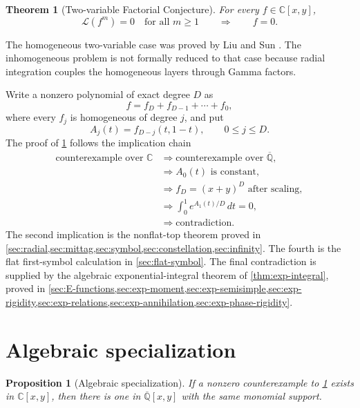 \documentclass[11pt]{article}
\numberwithin{equation}{section}
\newtheorem{theorem}{Theorem}[section]
\newtheorem{proposition}[proposition]{Proposition}
\theoremstyle{definition}
\theoremstyle{remark}
\newcommand{\C}{\mathbb C}
\newcommand{\Qbar}{\overline{\mathbb Q}}
\newcommand{\Lfac}{\mathcal L}
\begin{document}
\begin{theorem}[Two-variable Factorial Conjecture]\label{thm:FC2}
For every $f\in\C[x,y]$,
\[
  \Lfac(f^m)=0\quad\text{for all }m\ge1
  \qquad\Longrightarrow\qquad f=0.
\]
\end{theorem}

The homogeneous two-variable case was proved by Liu and Sun
\cite{LiuSun}.  The inhomogeneous problem is not formally reduced to that
case because radial integration couples the homogeneous layers through
Gamma factors.

Write a nonzero polynomial of exact degree $D$ as
\[
  f=f_D+f_{D-1}+\cdots+f_0,
\]
where every $f_j$ is homogeneous of degree $j$, and put
\begin{equation}\label{eq:intro-projective-layers}
  A_j(t)=f_{D-j}(t,1-t),\qquad 0\le j\le D.
\end{equation}
The proof of \cref{thm:FC2} follows the implication chain
\[
\begin{aligned}
\text{counterexample over }\C
&\Longrightarrow \text{counterexample over }\Qbar,\\
&\Longrightarrow A_0(t)\text{ is constant},\\
&\Longrightarrow f_D=(x+y)^D\text{ after scaling},\\
&\Longrightarrow \int_0^1 e^{A_1(t)/D}\,dt=0,\\
&\Longrightarrow \text{contradiction}.
\end{aligned}
\]
The second implication is the nonflat-top theorem proved in
\cref{sec:radial,sec:mittag,sec:symbol,sec:constellation,sec:infinity}.
The fourth is the flat first-symbol calculation in \cref{sec:flat-symbol}.
The final contradiction is supplied by the algebraic exponential-integral
theorem of \cref{thm:exp-integral}, proved in
\cref{sec:E-functions,sec:exp-moment,sec:exp-semisimple,sec:exp-rigidity,sec:exp-relations,sec:exp-annihilation,sec:exp-phase-rigidity}.

\section{Algebraic specialization}\label{sec:specialization}

\begin{proposition}[Algebraic specialization]\label{prop:algebraic-specialization}
If a nonzero counterexample to \cref{thm:FC2} exists in $\C[x,y]$, then
there is one in $\Qbar[x,y]$ with the same monomial support.
\end{proposition}
\end{document}
